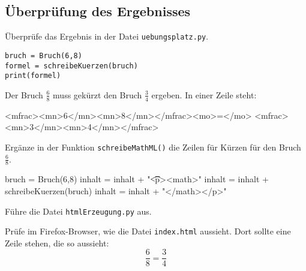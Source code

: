 \subsection*{Überprüfung des Ergebnisses}

Überprüfe das Ergebnis in der Datei \texttt{uebungsplatz.py}. 

\lstset{style=syntaxPython}
\begin{lstlisting}
bruch = Bruch(6,8)
formel = schreibeKuerzen(bruch)
print(formel)
\end{lstlisting}

Der Bruch $\frac{6}{8}$ muss gekürzt den Bruch $\frac{3}{4}$ ergeben. In einer Zeile steht:

\begin{codeHTML}
<mfrac><mn>6</mn><mn>8</mn></mfrac><mo>=</mo>
								<mfrac><mn>3</mn><mn>4</mn></mfrac>
\end{codeHTML}

Ergänze in der Funktion \texttt{schreibeMathML()} die Zeilen für Kürzen für den Bruch $\frac{6}{8}$.

\begin{codePython}
bruch = Bruch(6,8)
inhalt = inhalt + "\n\t\t<p><math>"
inhalt = inhalt + schreibeKuerzen(bruch)
inhalt = inhalt + "</math></p>"
\end{codePython}

Führe die Datei \texttt{htmlErzeugung.py} aus.

Prüfe im Firefox-Browser, wie die Datei \texttt{index.html} aussieht. Dort sollte eine Zeile stehen, die so aussieht:
\[
\frac{6}{8} = \frac{3}{4}
\]
